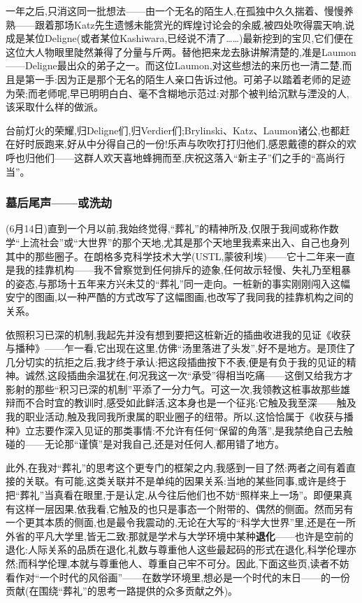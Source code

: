 一年之后,只消这同一批想法——由一个无名的陌生人,在孤独中久久揣着、慢慢养熟——跟着那场Katz先生遗憾未能赏光的辉煌讨论会的余威,被四处吹得震天响,说成是某位Deligne(或者某位Kashiwara,已经说不清了……)最新挖到的宝贝,它们便\dmark{}在这位大人物眼里陡然兼得了分量与斤两。替他把来龙去脉讲解清楚的,准是Laumon——Deligne最出众的弟子之一。而这位Laumon,对这些想法的来历也一清二楚,而且是第一手:因为正是那个无名的陌生人亲口告诉过他。可弟子以踏着老师的足迹为荣;而老师呢,早已明明白白、毫不含糊地示范过:对那个被判给沉默与湮没的人,该采取什么样的做派。

台前灯火的荣耀,归Deligne们,归Verdier们;Brylinski、Katz、Laumon诸公,也都赶在好时辰跑来,好从中分得自己的一份!乐声与吹吹打打归他们,感恩戴德的群众的欢呼也归他们——这群人欢天喜地蜂拥而至,庆祝这落入“新主子”们之手的“高尚行当”。

\subsubsection*{墓后尾声——或洗劫}


\pmark{}(6月14日)直到一个月以前,我始终觉得,“葬礼”的精神所及,仅限于我间或称作数学“上流社会”或“大世界”的那个天地,尤其是那个天地里我素来出入、自己也身列其中的那些圈子。在朗格多克科学技术大学(USTL,蒙彼利埃)——它十二年来一直是我的挂靠机构——我不曾察觉到任何排斥的迹象,任何故示轻慢、失礼乃至粗暴的姿态,与那场十五年来方兴未艾的“葬礼”同一走向。一桩新的事实刚刚闯入这幅安宁的图画,以一种严酷的方式改写了这幅图画,也改写了我同我的挂靠机构之间的关系。

依照积习已深的机制,我起先并没有想到要把这桩新近的插曲收进我的见证《收获与播种》——乍一看,它出现在这里,仿佛“汤里落进了头发”,好不是地方。是顶住了几分切实的抗拒之后,我才终于承认:把这段插曲按下不表,便是有负于我的见证的精神。诚然,这段插曲余温犹在,何况我这一次“承受”得相当吃痛——这倒又给我方才影射的那些“积习已深的机制”平添了一分力气。可这一次,我领教这桩事故那些雄辩而不合时宜的教训时,感受如此鲜活,这本身也是一个征兆:它触及我至深——触及我的职业活动,触及我同我所隶属的职业圈子的纽带。所以,这恰恰属于《收获与播种》立志要作深入见证的那类事情:不允许有任何“保留的角落”,是我禁绝自己去触碰的——无论那“谨慎”是对我自己,还是对任何人,都用错了地方。

此外,在我对“葬礼”的思考这个更专门的框架之内,我感到一目了然:两者之间有着直接的关联。有可能,这类关联并不是单纯的因果关系:当地的某些同事,或许是终于把“葬礼”当真看在眼里,于是认定,从今往后他们也不妨“照样来上一场”。即便果真有这样一层因果,依我看,它触及的也只是事态一个附带的、偶然的侧面。然而另有一个更其本质的侧面,也是最令我震动的,无论在大写的“科学大世界”里,还是在一所外省的平凡大学里,皆无二致:那就是学术与大学环境中某种\pmark{}\textbf{退化}——也许是空前的退化:人际关系的品质在退化,礼数与尊重他人这些最起码的形式在退化,科学伦理亦然;而科学伦理,本就与尊重他人、尊重自己牢不可分。因此,下面这些页,读者不妨看作对“一个时代的风俗画”——在数学环境里,想必是一个时代的末日——的一份贡献(在围绕“葬礼”的思考一路提供的众多贡献之外)。

